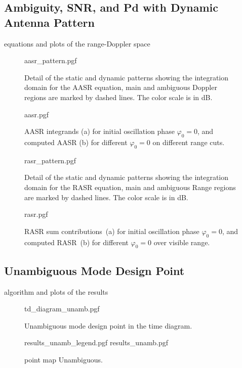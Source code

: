 \documentclass[11pt, a4paper]{scrartcl}
\begin{document}
    \subsection{Ambiguity, SNR, and Pd with Dynamic Antenna Pattern}
    \label{subsec:ambiguity_snr_pd_with_dynamic_antenna_pattern}
    equations and plots of the range-Doppler space
    \begin{figure}[!htb]
        {aasr_pattern.pgf}
        \caption{Detail of the static and dynamic patterns showing the integration domain for the AASR equation, main and ambiguous
        Doppler regions are marked by dashed lines. The color scale is in dB.
        }
        \label{fig:aasrpattern}
    \end{figure}
    \begin{figure}[!htb]
        {aasr.pgf}
        \caption{AASR integrands (a) for initial oscillation phase $\varphi_0=0$, and computed AASR (b) for different $\varphi_0=0$ on different range cuts.
        }
        \label{fig:aasr}
    \end{figure}
    \begin{figure}[!htb]
        {rasr_pattern.pgf}
        \caption{Detail of the static and dynamic patterns showing the integration domain for the RASR equation, main and ambiguous
        Range regions are marked by dashed lines. The color scale is in dB.
        }
        \label{fig:rasrpattern}
    \end{figure}
    \begin{figure}[!htb]
        {rasr.pgf}
        \caption{RASR sum contributions~(a) for initial oscillation phase $\varphi_0=0$, and computed RASR~(b) for different $\varphi_0=0$ over visible range.
        }
        \label{fig:rasr}
    \end{figure}

    \subsection{Unambiguous Mode Design Point}
    \label{subsec:unambiguous_mode_design_point}
    algorithm and plots of the results\\
    \begin{figure}[!htb]
        \centering
        {td_diagram_unamb.pgf}
        \caption{Unambiguous mode design point in the time diagram.
        }
        \label{fig:unambigmode}
    \end{figure}
    \begin{figure}[!htb]
        \centering
        {results_unamb_legend.pgf}
        {results_unamb.pgf}
        \caption{point map Unambiguous.}
        \label{fig:unambigresult}
    \end{figure}
\end{document}
